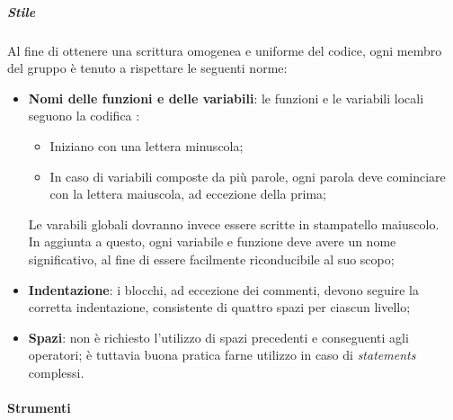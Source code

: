 \documentclass[../norme-di-progetto.tex]{subfiles}
\begin{document}
\subparagraph{Stile}
Al fine di ottenere una scrittura omogenea e uniforme del codice, ogni membro del gruppo è tenuto a rispettare le seguenti norme:
\begin{itemize}
  \item \textbf{Nomi delle funzioni e delle variabili}: le funzioni e le variabili locali seguono la codifica :
      \begin{itemize}
      \item Iniziano con una lettera minuscola;
      \item In caso di variabili composte da più parole, ogni parola deve cominciare con la lettera maiuscola, ad eccezione della prima;
      \end{itemize}
      Le varabili globali dovranno invece essere scritte in stampatello maiuscolo. \\
      In aggiunta a questo, ogni variabile e funzione deve avere un nome significativo, al fine di essere facilmente riconducibile al suo scopo;
  \item \textbf{Indentazione}: i blocchi, ad eccezione dei commenti, devono seguire la corretta indentazione, consistente di quattro spazi per ciascun livello;
  \item \textbf{Spazi}: non è richiesto l'utilizzo di spazi precedenti e conseguenti agli operatori; è tuttavia buona pratica farne utilizzo in caso di \textit{statements} complessi.
\end{itemize}

\paragraph{Strumenti}

\newpage
\end{document}
